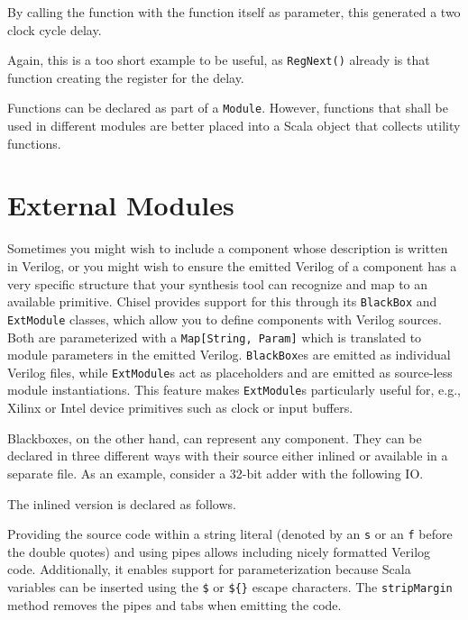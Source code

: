 \documentclass[%
    10pt,
    headinclude, footexclude,
    openright, %
    notitlepage,
    cleardoubleempty,
    headsepline,
    pointlessnumbers,
    bibtotoc, idxtotoc,
    ]{scrbook}
\newcommand{\code}[1]{{\small{\texttt{#1}}}}
\begin{document}

\noindent By calling the function with the function itself as parameter, this generated a two
clock cycle delay.


\noindent Again, this is a too short example to be useful, as \code{RegNext()}
already is that function creating the register for the delay.

Functions can be declared as part of a \code{Module}. However, functions that shall be
used in different modules are better placed into a Scala object that collects utility
functions.

\section{External Modules}

Sometimes you might wish to include a component whose description is 
written in Verilog, or you might wish to ensure the emitted Verilog of a component 
has a very specific structure that your synthesis tool can recognize and map to an 
available primitive. Chisel provides support for this through its \code{BlackBox} and 
\code{ExtModule} classes, which allow you to define components with Verilog sources. 
Both are parameterized with a \code{Map[String, Param]} which is translated to module 
parameters in the emitted Verilog. \code{BlackBox}es are emitted as individual Verilog 
files, while \code{ExtModule}s act as placeholders and are emitted as source-less module 
instantiations. This feature makes \code{ExtModule}s particularly useful for, e.g., 
Xilinx or Intel device primitives such as clock or input buffers.


\noindent Blackboxes, on the other hand, can represent any component. They can be 
declared in three different ways with their source either inlined or available in a 
separate file. As an example, consider a 32-bit adder with the following IO.

\noindent The inlined version is declared as follows. 

Providing the source code within a string literal (denoted by an \code{s} or an \code{f} 
before the double quotes) and using pipes allows including nicely formatted Verilog code. 
Additionally, it enables support for parameterization because Scala variables can be 
inserted using the \code{\$} or \code{\$\{\}} escape characters. The \code{stripMargin} 
method removes the pipes and tabs when emitting the code.
\end{document}
